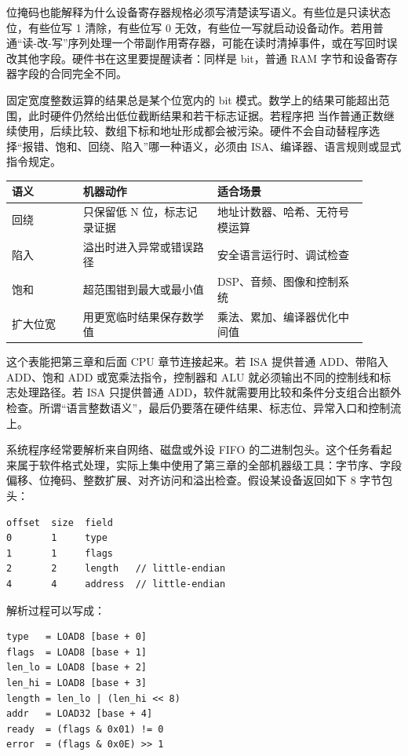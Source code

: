 位掩码也能解释为什么设备寄存器规格必须写清楚读写语义。有些位是只读状态位，有些位写 1 清除，有些位写 0 无效，有些位一写就启动设备动作。若用普通“读-改-写”序列处理一个带副作用寄存器，可能在读时清掉事件，或在写回时误改其他字段。硬件书在这里要提醒读者：同样是 bit，普通 RAM 字节和设备寄存器字段的合同完全不同。

固定宽度整数运算的结果总是某个位宽内的 bit 模式。数学上的结果可能超出范围，此时硬件仍然给出低位截断结果和若干标志证据。若程序把  当作普通正数继续使用，后续比较、数组下标和地址形成都会被污染。硬件不会自动替程序选择“报错、饱和、回绕、陷入”哪一种语义，必须由 ISA、编译器、语言规则或显式指令规定。

\begin{longtable}{L{0.18\linewidth}L{0.34\linewidth}L{0.38\linewidth}}
\toprule
语义 & 机器动作 & 适合场景 \\
\midrule
回绕 & 只保留低 N 位，标志记录证据 & 地址计数器、哈希、无符号模运算 \\
陷入 & 溢出时进入异常或错误路径 & 安全语言运行时、调试检查 \\
饱和 & 超范围钳到最大或最小值 & DSP、音频、图像和控制系统 \\
扩大位宽 & 用更宽临时结果保存数学值 & 乘法、累加、编译器优化中间值 \\
\bottomrule
\end{longtable}

这个表能把第三章和后面 CPU 章节连接起来。若 ISA 提供普通 ADD、带陷入 ADD、饱和 ADD 或宽乘法指令，控制器和 ALU 就必须输出不同的控制线和标志处理路径。若 ISA 只提供普通 ADD，软件就需要用比较和条件分支组合出额外检查。所谓“语言整数语义”，最后仍要落在硬件结果、标志位、异常入口和控制流上。

系统程序经常要解析来自网络、磁盘或外设 FIFO 的二进制包头。这个任务看起来属于软件格式处理，实际上集中使用了第三章的全部机器级工具：字节序、字段偏移、位掩码、整数扩展、对齐访问和溢出检查。假设某设备返回如下 8 字节包头：

\begin{lstlisting}
offset  size  field
0       1     type
1       1     flags
2       2     length   // little-endian
4       4     address  // little-endian
\end{lstlisting}

解析过程可以写成：

\begin{lstlisting}
type   = LOAD8 [base + 0]
flags  = LOAD8 [base + 1]
len_lo = LOAD8 [base + 2]
len_hi = LOAD8 [base + 3]
length = len_lo | (len_hi << 8)
addr   = LOAD32 [base + 4]
ready  = (flags & 0x01) != 0
error  = (flags & 0x0E) >> 1
\end{lstlisting}

